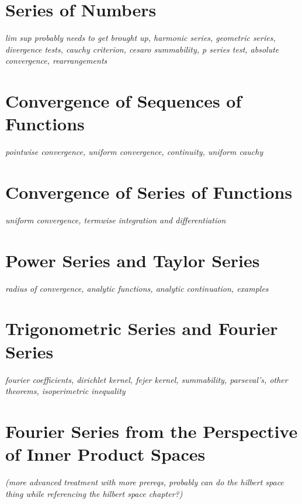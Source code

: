 \documentclass[../../../main.tex]{subfiles}
\begin{document}

\section{Series of Numbers}
\textit{lim sup probably needs to get brought up, harmonic series, geometric series, divergence tests, cauchy criterion, cesaro summability, p series test, absolute convergence, rearrangements}
\section{Convergence of Sequences of Functions}
\textit{pointwise convergence, uniform convergence, continuity, uniform cauchy}
\section{Convergence of Series of Functions}
\textit{uniform convergence, termwise integration and differentiation}
\section{Power Series and Taylor Series}
\textit{radius of convergence, analytic functions, analytic continuation, examples}
\section{Trigonometric Series and Fourier Series}
\textit{fourier coefficients, dirichlet kernel, fejer kernel, summability, parseval's, other theorems, isoperimetric inequality}
\section{Fourier Series from the Perspective of Inner Product Spaces}
\textit{(more advanced treatment with more prereqs, probably can do the hilbert space thing while referencing the hilbert space chapter?)}

\printbibliography[
    heading=subbibintoc,
    title={References}
]
\end{document}
